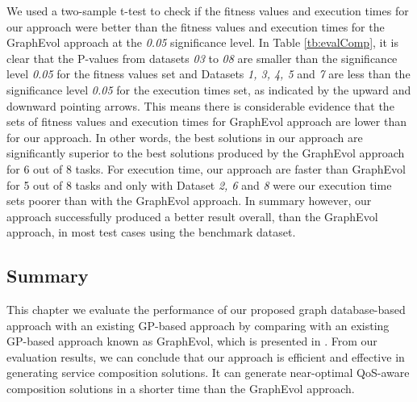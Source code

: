 We used a two-sample t-test to check if the fitness values and execution times for our approach were better than the fitness values and execution times for the GraphEvol approach at the \emph{0.05} significance level. In Table \ref{tb:evalComp}, it is clear that the P-values from datasets \emph{03} to \emph{08} are smaller than the significance level \emph{0.05} for the fitness values set and Datasets \emph{1, 3, 4, 5} and \emph{7} are less than the significance level \emph{0.05} for the execution times set, as indicated by the upward and downward pointing arrows. This means there is considerable evidence that the sets of fitness values and execution times for GraphEvol approach are lower than for our approach. In other words, the best solutions in our approach are significantly superior to the best solutions produced by the GraphEvol approach for 6 out of 8 tasks. For execution time, our approach are faster than GraphEvol for 5 out of 8 tasks and only with Dataset \emph{2, 6} and \emph{8} were our execution time sets poorer than with the GraphEvol approach. In summary however, our approach successfully produced a better result overall, than the GraphEvol approach, in most test cases using the benchmark dataset.\par

\subsection{Summary}
This chapter we evaluate  the performance of our proposed graph database-based approach with an existing GP-based approach by comparing with an existing GP-based approach known as GraphEvol, which is presented in \cite{2}. From our evaluation results, we can conclude that our approach is efficient and effective in generating service composition solutions. It can generate near-optimal QoS-aware composition solutions in a shorter time than the GraphEvol approach.